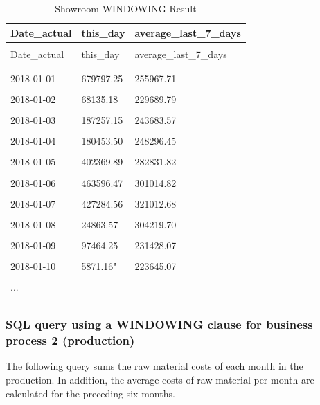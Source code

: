 \documentclass[letterpaper,12pt]{article}
\begin{document}
\begingroup
\renewcommand\arraystretch{0.5}
\begin{longtable}{p{4cm}p{4cm}p{4cm}}
        \caption{Showroom WINDOWING Result} \\
	Date\_actual & this\_day & average\_last\_7\_days \\
        \endfirsthead \\
        Date\_actual & this\_day & average\_last\_7\_days \\
        \endhead \\
        \hline \\
        2018-01-01 & 679797.25 & 255967.71 \\
        \hline \\
        2018-01-02 & 68135.18 & 229689.79 \\
        \hline \\
        2018-01-03 & 187257.15 & 243683.57 \\
        \hline \\
        2018-01-04 & 180453.50 & 248296.45 \\
        \hline \\
        2018-01-05 & 402369.89 & 282831.82 \\
        \hline \\
        2018-01-06 & 463596.47 & 301014.82 \\
        \hline \\
        2018-01-07 & 427284.56 & 321012.68 \\
        \hline \\
        2018-01-08 & 24863.57 & 304219.70 \\
        \hline \\
        2018-01-09 & 97464.25 & 231428.07 \\
        \hline \\
        2018-01-10 & 5871.16" & 223645.07 \\
        \hline \\
        ... & & \\
        \hline \\
\end{longtable}
\endgroup

\subsubsection{SQL query using a WINDOWING clause for business process 2 (production)}

The following query sums the raw material costs of each month in the production. In addition, the average costs of raw material per month are calculated for the preceding six months.
\end{document}
